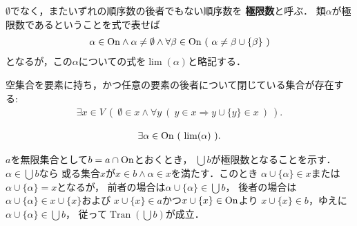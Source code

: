 	\begin{screen}
		\begin{dfn}[極限数]
			$\emptyset$でなく，またいずれの順序数の後者でもない順序数を
			{\bf 極限数}と呼ぶ．
			類$\alpha$が極限数であるということを式で表せば
			\begin{align}
				\alpha \in \ON \wedge \alpha \neq \emptyset
				\wedge \forall \beta \in \ON\ 
				(\ \alpha \neq \beta \cup \{\beta\}\ )
			\end{align}
			となるが，この$\alpha$についての式を$\operatorname{lim}(\alpha)$と略記する．
		\end{dfn}
	\end{screen}
	
	
	\begin{screen}
		\begin{axm}[無限公理]
			空集合を要素に持ち，かつ任意の要素の後者について閉じている集合が存在する:
			\begin{align}
				\exists x \in V\ (\ \emptyset \in x \wedge \forall y\ (\ y \in x
				\Longrightarrow y \cup \{y\} \in x\ )\ ).
			\end{align}
		\end{axm}
	\end{screen}
	
	\begin{screen}
		\begin{thm}[極限数は存在する]
			\begin{align}
				\exists \alpha \in \ON\ (\ \operatorname{lim}(\alpha)\ ).
			\end{align}
		\end{thm}
	\end{screen}
	
	\begin{prf}
		$a$を無限集合として$b = a \cap \mathrm{On}$とおくとき，
		$\bigcup b$が極限数となることを示す．
		$\alpha \in \bigcup b$なら
		或る集合$x$が$x \in b \wedge \alpha \in x$を満たす．このとき
		$\alpha \cup \{\alpha\} \in x$または$\alpha \cup \{\alpha\} = x$となるが，
		前者の場合は$\alpha \cup \{\alpha\} \in \bigcup b$，
		後者の場合は$\alpha \cup \{\alpha\} \in x \cup \{x\}$および
		$x \cup \{x\} \in a$かつ$x \cup \{x\} \in \mathrm{On}$より
		$x \cup \{x\} \in b$，ゆえに$\alpha \cup \{\alpha\} \in \bigcup b$，
		従って$\operatorname*{Tran}(\bigcup b)$が成立．
	\end{prf}
	
